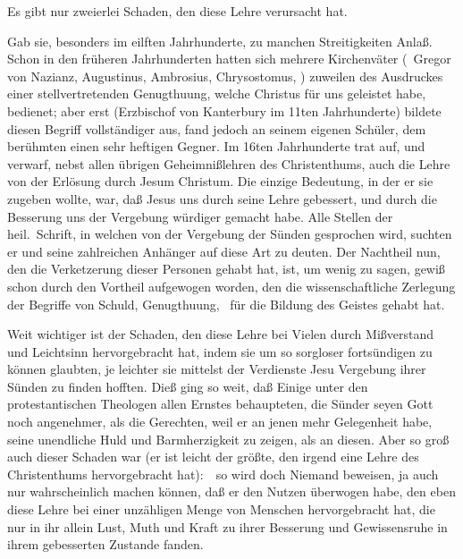 Es gibt nur zweierlei Schaden, den diese Lehre verursacht hat.
\begin{aufza}
\item Gab sie, besonders im eilften Jahrhunderte, zu manchen Streitigkeiten Anlaß. Schon in den früheren Jahrhunderten hatten sich mehrere Kirchenväter (\zB\ Gregor von Nazianz, Augustinus, Ambrosius, Chrysostomus, \usw ) zuweilen des Ausdruckes einer stellvertretenden Genugthuung, welche Christus für uns geleistet habe, bedienet; aber erst  (Erzbischof von Kanterbury im 11ten Jahrhunderte) bildete diesen Begriff vollständiger aus, fand jedoch an seinem eigenen Schüler, dem berühmten  einen sehr heftigen Gegner. Im 16ten Jahrhunderte trat  auf, und verwarf, nebst allen übrigen Geheimnißlehren des Christenthums, auch die Lehre von der Erlösung durch Jesum Christum. Die einzige Bedeutung, in der er sie zugeben wollte, war, daß Jesus uns durch seine Lehre gebessert, und durch die Besserung uns der Vergebung würdiger gemacht habe. Alle Stellen der heil.\ Schrift, in welchen von der Vergebung der Sünden gesprochen wird, suchten er und seine zahlreichen Anhänger auf diese Art zu deuten. Der Nachtheil nun, den die Verketzerung dieser Personen gehabt hat, ist, um wenig zu sagen, gewiß schon durch den Vortheil aufgewogen worden, den die wissenschaftliche Zerlegung der Begriffe von Schuld, Genugthuung, \usw\ für die Bildung des Geistes gehabt hat.
\item Weit wichtiger ist der Schaden, den diese Lehre bei Vielen durch Mißverstand und Leichtsinn hervorgebracht hat, indem sie um so sorgloser fortsündigen zu können glaubten, je leichter sie mittelst der Verdienste Jesu Vergebung ihrer Sünden zu finden hofften. Dieß ging so weit, daß Einige unter den protestantischen Theologen allen Ernstes behaupteten, die Sünder seyen Gott noch angenehmer, als die Gerechten, weil er an jenen mehr Gelegenheit habe, seine unendliche Huld und Barmherzigkeit zu zeigen, als an diesen. Aber so groß auch dieser Schaden war (er ist leicht der größte, den irgend eine Lehre des Christenthums hervorgebracht hat):~\ so wird doch Niemand beweisen, ja auch nur wahrscheinlich machen können, daß er den Nutzen überwogen habe, den eben diese Lehre bei einer unzähligen Menge von Menschen hervorgebracht hat, die nur in ihr allein Lust, Muth und Kraft zu ihrer Besserung und Gewissensruhe in ihrem gebesserten Zustande fanden.
\end{aufza}

